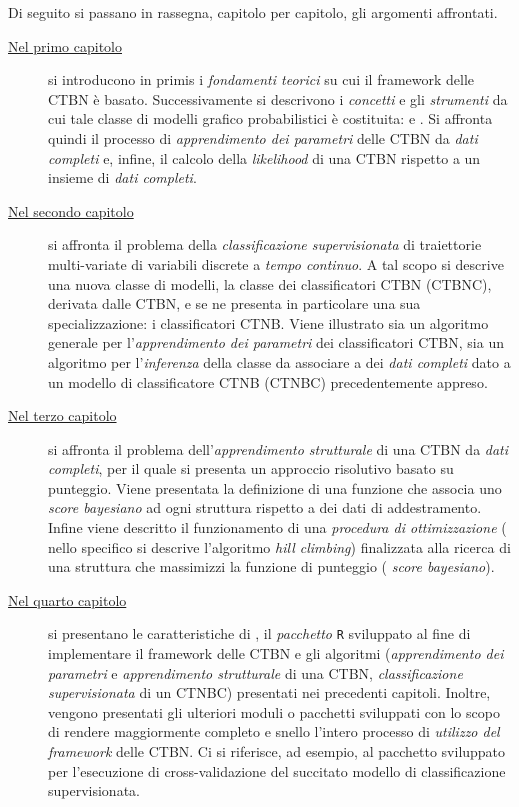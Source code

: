 Di seguito si passano in rassegna, capitolo per capitolo, gli argomenti affrontati.
\begin{description}
	\item[{\hyperref[cap:ctbn]{Nel primo capitolo}}]
	si introducono in primis i \emph{fondamenti teorici} su cui il framework delle \acf{CTBN} è basato. Successivamente si descrivono i \emph{concetti} e gli \emph{strumenti} da cui tale classe di modelli grafico probabilistici è costituita: \emph{\cim{}} e \emph{\stats{}}. Si affronta quindi il processo di \emph{apprendimento dei parametri} delle \acs{CTBN} da \emph{dati completi} e, infine, il calcolo della \emph{likelihood} di una \acs{CTBN} rispetto a un insieme di \emph{dati completi}.
	\item[{\hyperref[cap:ctbnc]{Nel secondo capitolo}}]
	si affronta il problema della \emph{classificazione supervisionata} di traiettorie multi-variate di variabili discrete a \emph{tempo continuo}. A tal scopo si descrive una nuova classe di modelli, la classe dei classificatori \acl{CTBN} (\acs{CTBNC}), derivata dalle \acs{CTBN}, e se ne presenta in particolare una sua specializzazione: i classificatori \acs{CTNB}. Viene illustrato sia un algoritmo generale per l'\emph{apprendimento dei parametri} dei classificatori \acs{CTBN}, sia un algoritmo per l'\emph{inferenza} della classe da associare a dei \emph{dati completi} dato a un modello di classificatore \acs{CTNB} (\acs{CTNBC}) precedentemente appreso.
	\item[{\hyperref[cap:structurallearning]{Nel terzo capitolo}}]
	si affronta il problema dell'\emph{apprendimento strutturale} di una \acs{CTBN} da \emph{dati completi}, per il quale si presenta un approccio risolutivo basato su punteggio. Viene presentata la definizione di una funzione che associa uno \emph{score bayesiano} ad ogni struttura rispetto a dei dati di addestramento. Infine viene descritto il funzionamento di una \emph{procedura di ottimizzazione} (\ie{} nello specifico si descrive l'algoritmo \emph{hill climbing}) finalizzata alla ricerca di una struttura che massimizzi la funzione di punteggio (\ie{} \emph{score bayesiano}).
	\item[{\hyperref[cap:ctbnr]{Nel quarto capitolo}}]
	si presentano le caratteristiche di , il \emph{pacchetto} \lstinline[]|R| sviluppato al fine di implementare il framework delle \acs{CTBN} e gli algoritmi (\emph{apprendimento dei parametri} e \emph{apprendimento strutturale} di una \acs{CTBN}, \emph{classificazione supervisionata} di un \acs{CTNBC}) presentati nei precedenti capitoli. Inoltre, vengono presentati gli ulteriori moduli o pacchetti sviluppati con lo scopo di rendere maggiormente completo e snello l'intero processo di \emph{utilizzo del framework} delle \acs{CTBN}. Ci si riferisce, ad esempio, al pacchetto sviluppato per l'esecuzione di cross-validazione del succitato modello di classificazione supervisionata.

\end{description}
